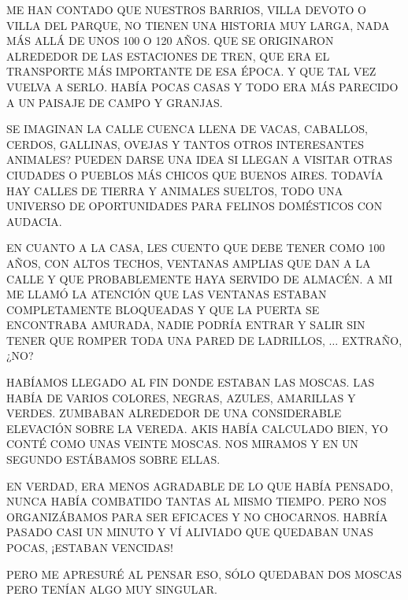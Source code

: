 ME HAN CONTADO QUE NUESTROS BARRIOS, VILLA DEVOTO O VILLA DEL PARQUE, NO TIENEN UNA HISTORIA MUY LARGA, NADA MÁS ALLÁ DE UNOS 100 O 120 AÑOS. QUE SE ORIGINARON ALREDEDOR DE LAS ESTACIONES DE TREN, QUE ERA EL TRANSPORTE MÁS IMPORTANTE DE ESA ÉPOCA. Y QUE TAL VEZ VUELVA A SERLO. HABÍA POCAS CASAS Y TODO ERA MÁS PARECIDO A UN PAISAJE DE CAMPO Y GRANJAS. 


\newpage
{}	
SE IMAGINAN LA CALLE CUENCA LLENA DE VACAS, CABALLOS, CERDOS, GALLINAS, OVEJAS Y TANTOS OTROS INTERESANTES ANIMALES? PUEDEN DARSE UNA IDEA SI LLEGAN A VISITAR OTRAS CIUDADES O PUEBLOS MÁS CHICOS QUE BUENOS AIRES. TODAVÍA HAY CALLES DE TIERRA Y ANIMALES SUELTOS, TODO UNA UNIVERSO DE OPORTUNIDADES PARA FELINOS DOMÉSTICOS CON AUDACIA.

EN CUANTO A LA CASA, LES CUENTO QUE DEBE TENER COMO 100 AÑOS, CON ALTOS TECHOS, VENTANAS AMPLIAS QUE DAN A LA CALLE Y QUE PROBABLEMENTE HAYA SERVIDO DE ALMACÉN. A MI ME LLAMÓ LA ATENCIÓN QUE LAS VENTANAS ESTABAN COMPLETAMENTE BLOQUEADAS Y QUE LA PUERTA SE ENCONTRABA AMURADA, NADIE PODRÍA ENTRAR Y SALIR SIN TENER QUE ROMPER TODA UNA PARED DE LADRILLOS, $\ldots$ EXTRAÑO, ¿NO?


\newpage
{}
HABÍAMOS LLEGADO AL FIN DONDE ESTABAN LAS MOSCAS. LAS HABÍA DE VARIOS COLORES, NEGRAS, AZULES, AMARILLAS Y VERDES. ZUMBABAN ALREDEDOR DE UNA  CONSIDERABLE ELEVACIÓN SOBRE LA VEREDA. AKIS HABÍA CALCULADO BIEN, YO CONTÉ COMO UNAS VEINTE MOSCAS. NOS MIRAMOS Y EN UN SEGUNDO ESTÁBAMOS SOBRE ELLAS.

EN VERDAD, ERA MENOS AGRADABLE DE LO QUE HABÍA PENSADO, NUNCA HABÍA COMBATIDO TANTAS AL MISMO TIEMPO. PERO NOS ORGANIZÁBAMOS PARA SER EFICACES Y NO CHOCARNOS. HABRÍA PASADO CASI UN MINUTO Y VÍ ALIVIADO QUE QUEDABAN UNAS POCAS, ¡ESTABAN VENCIDAS!

PERO ME APRESURÉ AL PENSAR ESO, SÓLO QUEDABAN DOS MOSCAS PERO TENÍAN ALGO MUY SINGULAR.



